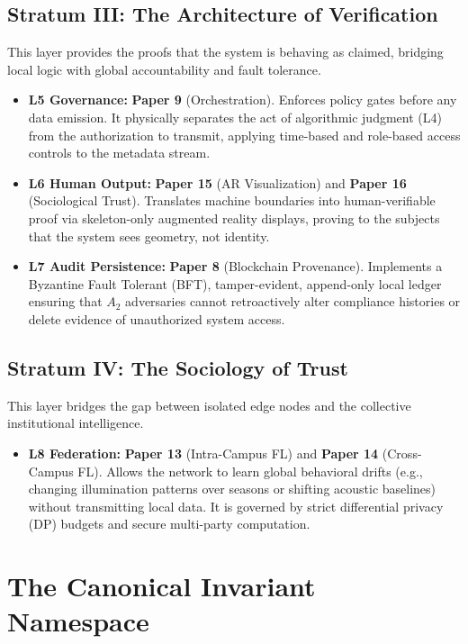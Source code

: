 \documentclass[conference]{IEEEtran}
\theoremstyle{definition}
\begin{document}
\subsection{Stratum III: The Architecture of Verification}
This layer provides the proofs that the system is behaving as claimed, bridging local logic with global accountability and fault tolerance.
\begin{itemize}
    \item \textbf{L5 Governance:} \textbf{Paper 9} (Orchestration). Enforces policy gates before any data emission. It physically separates the act of algorithmic judgment (L4) from the authorization to transmit, applying time-based and role-based access controls to the metadata stream.
    \item \textbf{L6 Human Output:} \textbf{Paper 15} (AR Visualization) and \textbf{Paper 16} (Sociological Trust). Translates machine boundaries into human-verifiable proof via skeleton-only augmented reality displays, proving to the subjects that the system sees geometry, not identity.
    \item \textbf{L7 Audit Persistence:} \textbf{Paper 8} (Blockchain Provenance). Implements a Byzantine Fault Tolerant (BFT), tamper-evident, append-only local ledger ensuring that $A_2$ adversaries cannot retroactively alter compliance histories or delete evidence of unauthorized system access.
\end{itemize}

\subsection{Stratum IV: The Sociology of Trust}
This layer bridges the gap between isolated edge nodes and the collective institutional intelligence.
\begin{itemize}
    \item \textbf{L8 Federation:} \textbf{Paper 13} (Intra-Campus FL) and \textbf{Paper 14} (Cross-Campus FL). Allows the network to learn global behavioral drifts (e.g., changing illumination patterns over seasons or shifting acoustic baselines) without transmitting local data. It is governed by strict differential privacy (DP) budgets and secure multi-party computation.
\end{itemize}

\section{The Canonical Invariant Namespace}
\end{document}
